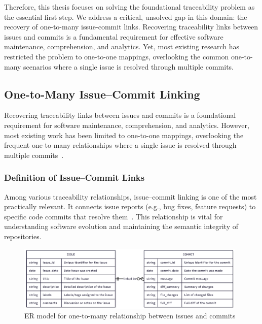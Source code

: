Therefore, this thesis focuses on solving the foundational traceability problem as the essential first step. We address a critical, unsolved gap in this domain: the recovery of one-to-many issue-commit links. Recovering traceability links between issues and commits is a fundamental requirement for effective software maintenance, comprehension, and analytics. Yet, most existing research has restricted the problem to one-to-one mappings, overlooking the common one-to-many scenarios where a single issue is resolved through multiple commits.

\subsection{One-to-Many Issue–Commit Linking}

Recovering traceability links between issues and commits is a foundational requirement for software maintenance, comprehension, and analytics. However, most existing work has been limited to one-to-one mappings, overlooking the frequent one-to-many relationships where a single issue is resolved through multiple commits~\cite{r11,r17,r21}.


\subsubsection*{Definition of Issue–Commit Links}

Among various traceability relationships, issue–commit linking is one of the most practically relevant. It connects issue reports (e.g., bug fixes, feature requests) to specific code commits that resolve them~\cite{r11,issue-commit-llm}. This relationship is vital for understanding software evolution and maintaining the semantic integrity of repositories.

\begin{figure}[H]
    \centering
    \includegraphics[width=0.98\textwidth]{Figures/er-issue-commit.png}
    \caption{ER model for one-to-many relationship between issues and commits}
    \label{fig:er_issue_commit}
\end{figure}


